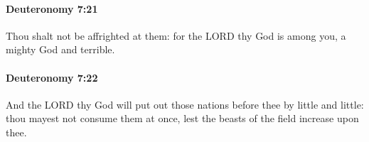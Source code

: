 		\paragraph{Deuteronomy 7:21} %
			\label{DEUTERONOMY-7-21}

			Thou shalt not be affrighted at them: for the LORD thy God is among you, a mighty God and terrible.


		\paragraph{Deuteronomy 7:22} %
			\label{DEUTERONOMY-7-22}

			And the LORD thy God will put out those nations before thee by little and little: thou mayest not consume them at once, lest the beasts of the field increase upon thee.


